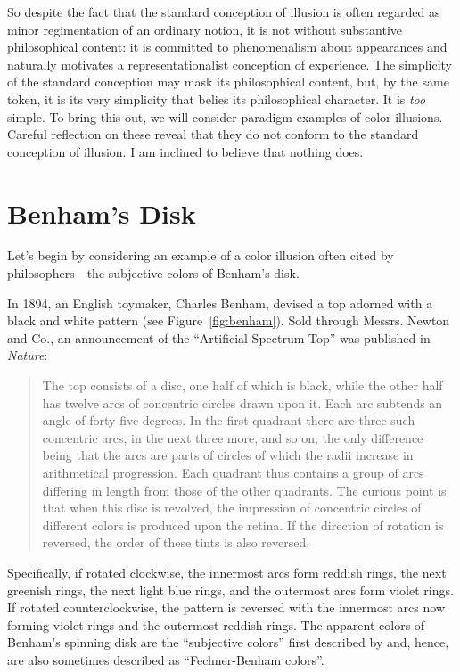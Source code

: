 \documentclass[12pt]{article}
\begin{document}
So despite the fact that the standard conception of illusion is often regarded as minor regimentation of an ordinary notion, it is not without substantive philosophical content: it is committed to phenomenalism about appearances and naturally motivates a representationalist conception of experience. The simplicity of the standard conception may mask its philosophical content, but, by the same token, it is its very simplicity that belies its philosophical character. It is \emph{too} simple. To bring this out, we will consider paradigm examples of color illusions. Careful reflection on these reveal that they do not conform to the standard conception of illusion. I am inclined to believe that nothing does.


\section{Benham's Disk} %
\label{sec:benham_s_disk}

Let's begin by considering an example of a color illusion often cited by philosophers---the subjective colors of Benham's disk.

In 1894, an English toymaker, Charles Benham, devised a top adorned with a black and white pattern (see Figure~\ref{fig:benham}). Sold through Messrs. Newton and Co., an announcement of the ``Artificial Spectrum Top'' was published in \emph{Nature}:
	\begin{quote}
		The top consists of a disc, one half of which is black, while the other half has twelve arcs of concentric circles drawn upon it. Each arc subtends an angle of forty-five degrees. In the first quadrant there are three such concentric arcs, in the next three more, and so on; the only difference being that the arcs are parts of circles of which the radii increase in arithmetical progression. Each quadrant thus contains a group of arcs differing in length from those of the other quadrants. The curious point is that when this disc is revolved, the impression of concentric circles of different colors is produced upon the retina. If the direction of rotation is reversed, the order of these tints is also reversed. \citep{Benham:1894kx}
	\end{quote}
Specifically, if rotated clockwise, the innermost arcs form reddish rings, the next greenish rings, the next light blue rings, and the outermost arcs form violet rings. If rotated counterclockwise, the pattern is reversed with the innermost arcs now forming violet rings and the outermost reddish rings. The apparent colors of Benham's spinning disk are the ``subjective colors'' first described by \citep{Fechner:1838vn} and, hence, are also sometimes described as ``Fechner-Benham colors''. 
\end{document}
